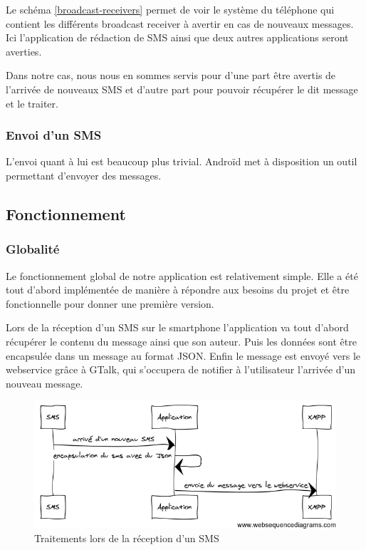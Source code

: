Le schéma \ref{broadcast-receivers} permet de voir le système du téléphone qui contient les différents broadcast receiver à avertir en cas de nouveaux messages. Ici l'application de rédaction de SMS ainsi que deux autres 
applications seront averties.

Dans notre cas, nous nous en sommes servis pour d'une part être avertis de l'arrivée de nouveaux SMS et d'autre part pour pouvoir récupérer le dit message et le traiter.


\subsubsection{Envoi d'un SMS}

L'envoi quant à lui est beaucoup plus trivial. Androïd met à disposition un outil permettant d'envoyer
des messages.





\subsection{Fonctionnement}


\subsubsection{Globalité}

Le fonctionnement global de notre application est relativement simple.
Elle a été tout d'abord implémentée de manière à répondre aux besoins du projet et être fonctionnelle pour donner une première version.

Lors de la réception d'un SMS sur le smartphone l'application va tout d'abord récupérer le contenu du message ainsi que son auteur.
Puis les données sont être encapsulée dans un message au format JSON.
Enfin le message est envoyé vers le webservice grâce à GTalk, qui s'occupera de notifier à l'utilisateur l'arrivée d'un nouveau message.

\begin{figure}[!h]
  \center
  \includegraphics[width=12cm]{img/encapsulation-sms.png}
  \caption{Traitements lors de la réception d'un SMS}
  \label{encapsulation-sms}
\end{figure}

